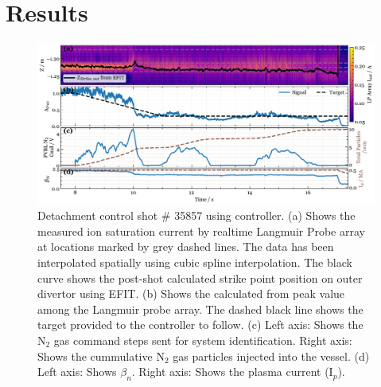 \section{Results}
\label{sec:results}

\begin{figure}[!ht]
 \centering
 \includegraphics[width=\textwidth]{figures/DetCtrl_2D_35857.pdf}
 \caption{Detachment control shot \# 35857 using \Afrac controller. (a) Shows the measured ion saturation current by realtime Langmuir Probe array at locations marked by grey dashed lines. The data has been interpolated spatially using cubic spline interpolation. The black curve shows the post-shot calculated strike point position on outer divertor using EFIT. (b) Shows the \Afrac calculated from peak value among the Langmuir probe array. The dashed black line shows the target provided to the controller to follow. (c) Left axis: Shows the N$_2$ gas command steps sent for system identification. Right axis: Shows the cummulative N$_2$ gas particles injected into the vessel. (d) Left axis: Shows $\beta_n$. Right axis: Shows the plasma current (I$_p$).}
 \label{fig:detctrl_afrac}
\end{figure}


